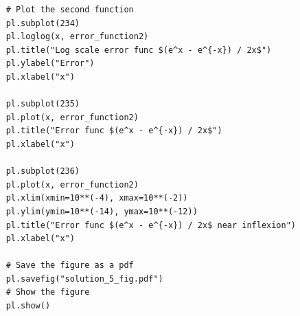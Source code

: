 \documentclass[a4paper,11pt]{article}
\begin{document}
{\begin{lstlisting}
	# Plot the second function
	pl.subplot(234)
	pl.loglog(x, error_function2)
	pl.title("Log scale error func $(e^x - e^{-x}) / 2x$")
	pl.ylabel("Error")
	pl.xlabel("x")
	
	pl.subplot(235)
	pl.plot(x, error_function2)
	pl.title("Error func $(e^x - e^{-x}) / 2x$")
	pl.xlabel("x")
	
	pl.subplot(236)
	pl.plot(x, error_function2)
	pl.xlim(xmin=10**(-4), xmax=10**(-2))
	pl.ylim(ymin=10**(-14), ymax=10**(-12))
	pl.title("Error func $(e^x - e^{-x}) / 2x$ near inflexion")
	pl.xlabel("x")

	# Save the figure as a pdf
	pl.savefig("solution_5_fig.pdf")
	# Show the figure
	pl.show()

\end{lstlisting}
}
\end{document}
